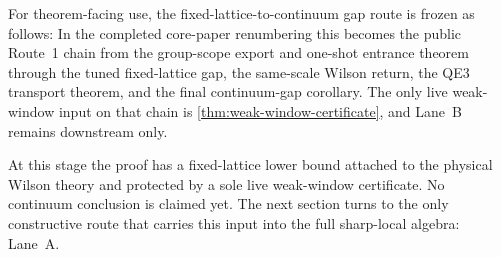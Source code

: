 \begin{remark}
For theorem-facing use, the fixed-lattice-to-continuum gap route is frozen as follows:
In the completed core-paper renumbering this becomes the public Route~1 chain from the group-scope export and one-shot entrance theorem through the tuned fixed-lattice gap, the same-scale Wilson return, the QE3 transport theorem, and the final continuum-gap corollary. The only live weak-window input on that chain is \cref{thm:weak-window-certificate}, and Lane~B remains downstream only.
\end{remark}

At this stage the proof has a fixed-lattice lower bound attached to the physical Wilson theory and protected by a sole live weak-window certificate. No continuum conclusion is claimed yet. The next section turns to the only constructive route that carries this input into the full sharp-local algebra: Lane~A.
